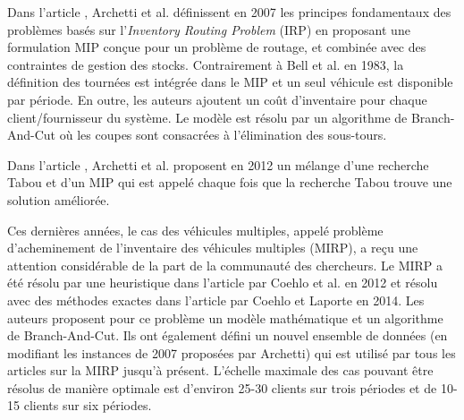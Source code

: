 




Dans l'article \cite{IRP_Archetti}, Archetti et al. définissent en 2007 les principes fondamentaux des problèmes basés sur l'\textit{Inventory Routing Problem} (IRP) en proposant une formulation MIP conçue pour un problème de routage, et combinée avec des contraintes de gestion des stocks. Contrairement à Bell et al. en 1983, la définition des tournées est intégrée dans le MIP et un seul véhicule est disponible par période. En outre, les auteurs ajoutent un coût d'inventaire pour chaque client/fournisseur du système. Le modèle est résolu par un algorithme de Branch-And-Cut où les coupes sont consacrées à l'élimination des sous-tours. 

Dans l'article \cite{IRP_Archetti_2012}, Archetti et al. proposent en 2012 un mélange d'une recherche Tabou et d'un MIP qui est appelé chaque fois que la recherche Tabou trouve une solution améliorée.

Ces dernières années, le cas des véhicules multiples, appelé problème d'acheminement de l'inventaire des véhicules multiples (MIRP), a reçu une attention considérable de la part de la communauté des chercheurs.
Le MIRP a été résolu par une heuristique dans l'article \cite{IRP_Leandro} par Coehlo et al. en 2012 et résolu avec des méthodes exactes dans l'article \cite{IRP_Coelho_2014} par Coehlo et Laporte en 2014. Les auteurs proposent pour ce problème un modèle mathématique et un algorithme de Branch-And-Cut. 
Ils ont également défini un nouvel ensemble de données (en modifiant les instances de 2007 proposées par Archetti) qui est utilisé par tous les articles sur la MIRP jusqu'à présent. L'échelle maximale des cas pouvant être résolus de manière optimale est d'environ 25-30 clients sur trois périodes et de 10-15 clients sur six périodes. 

